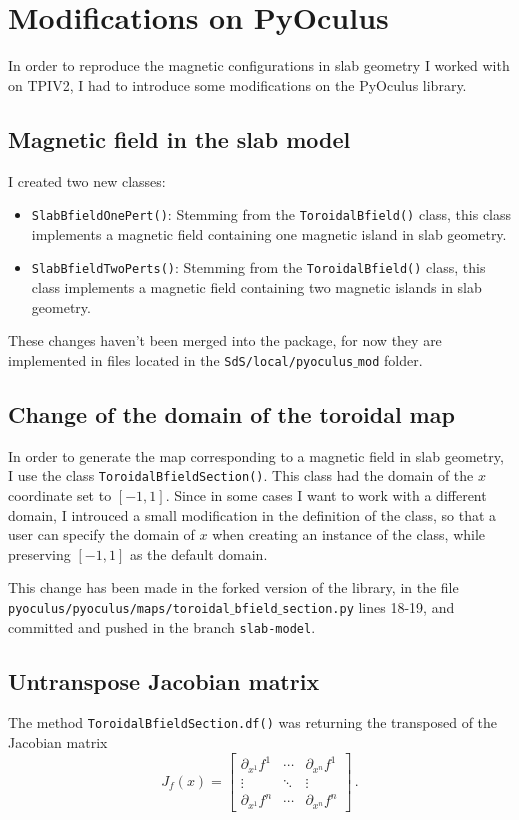 \section{Modifications on PyOculus}
In order to reproduce the magnetic configurations in slab geometry I worked with on TPIV2, I had to introduce some modifications on the PyOculus library.

\subsection{Magnetic field in the slab model}
I created two new classes:
\begin{itemize}
    \item \texttt{SlabBfieldOnePert()}: Stemming from the \texttt{ToroidalBfield()} class, this class implements a magnetic field containing one magnetic island in slab geometry.
    \item \texttt{SlabBfieldTwoPerts()}: Stemming from the \texttt{ToroidalBfield()} class, this class implements a magnetic field containing two magnetic islands in slab geometry.
\end{itemize}

These changes haven't been merged into the package, for now they are implemented in files located in the \texttt{SdS/local/pyoculus$\_$mod} folder.

\subsection{Change of the domain of the toroidal map}
In order to generate the map corresponding to a magnetic field in slab geometry, I use the class \texttt{ToroidalBfieldSection()}. This class had the domain of the $x$ coordinate set to $[-1,1]$. Since in some cases I want to work with a different domain, I introuced a small modification in the definition of the class, so that a user can specify the domain of $x$ when creating an instance of the class, while preserving $[-1,1]$ as the default domain.

This change has been made in the forked version of the library, in the file \texttt{pyoculus/pyoculus/maps/toroidal$\_$bfield$\_$section.py} lines 18-19, and committed and pushed in the branch \texttt{slab-model}.

\subsection{Untranspose Jacobian matrix}
The method \texttt{ToroidalBfieldSection.df()} was returning the transposed of the Jacobian matrix
\begin{equation}
    J_f(x) = \begin{bmatrix}
                \partial_{x^1}f^1 & \cdots & \partial_{x^n}f^1 \\
                \vdots & \ddots & \vdots 
                \\
                \partial_{x^1}f^n & \cdots & \partial_{x^n}f^n
            \end{bmatrix}\,.
\end{equation}

